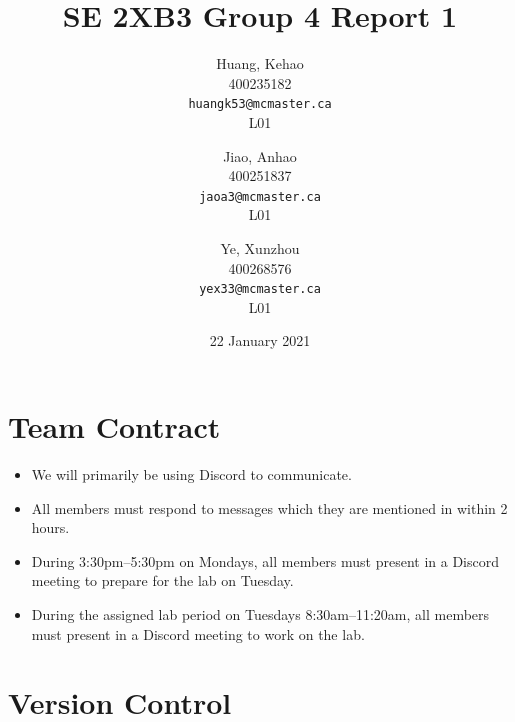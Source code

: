 \documentclass[titlepage, 12pt]{article}
\title{SE 2XB3 Group 4 Report 1}
\author{
  Huang, Kehao \\
  400235182 \\
  \texttt{huangk53@mcmaster.ca} \\
  L01
  \and
  Jiao, Anhao \\
  400251837 \\
  \texttt{jaoa3@mcmaster.ca} \\
  L01
  \and
  Ye, Xunzhou \\
  400268576 \\
  \texttt{yex33@mcmaster.ca} \\
  L01
}
\date{22 January 2021}
\begin{document}
\maketitle{}

\section*{Team Contract}
\label{sec:contract}

\begin{itemize}
\item We will primarily be using Discord to communicate.
\item All members must respond to messages which they are mentioned in within 2
  hours.
\item During 3:30pm--5:30pm on Mondays, all members must present in a Discord
  meeting to prepare for the lab on Tuesday.
\item During the assigned lab period on Tuesdays 8:30am--11:20am, all members
  must present in a Discord meeting to work on the lab.
\end{itemize}

\newpage{}

\section{Version Control}
\label{sec:git}
\end{document}
